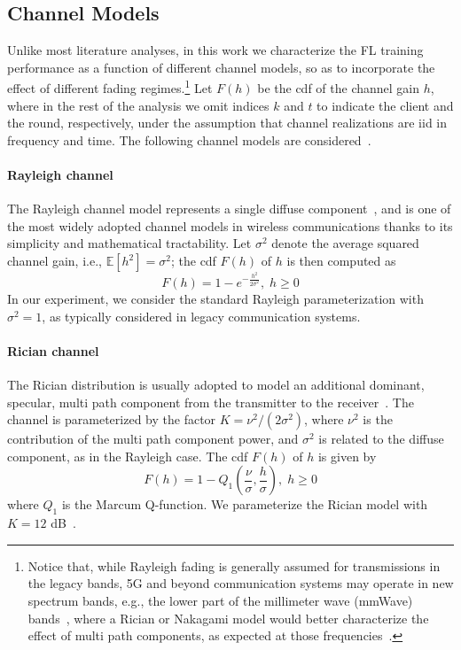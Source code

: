 \documentclass[10pt, conference, letterpaper]{IEEEtran}
\begin{document}
	\subsection{Channel Models}
	\label{sub:channel}
	Unlike most literature analyses, in this work we  characterize the FL training performance as a function of different channel models, so as to incorporate the effect of different fading regimes.\footnote{Notice that, while Rayleigh fading is generally assumed for transmissions in the legacy bands, 5G and beyond communication systems may operate in new spectrum bands, e.g., the lower part of the millimeter wave (mmWave) bands~\cite{rappaport2013millimeter}, where a Rician or Nakagami model would better characterize the effect of multi path components, as expected at those frequencies~\cite{lecci2020simplified}.}
	Let $F(h)$ be the \gls{cdf} of the channel gain $h$, where in the rest of the analysis we omit indices $k$ and $t$ to indicate the client and the round, respectively, under the assumption that channel realizations are \gls{iid} in frequency and time. The following channel models are considered~\cite{Angjelichinoski2019}.
	
	\paragraph{Rayleigh channel}
	The Rayleigh channel model represents a single diffuse component~\cite{Durgin2002}, and is one of the most widely adopted channel models in wireless communications thanks to its simplicity and mathematical tractability. Let $\sigma^2$ denote the average squared channel gain, i.e., $\mathbb{E}[h^2] = \sigma^2$; the \gls{cdf} $F(h)$ of $h$ is then computed as
	\begin{equation}
		F (h) = 1 - e^{-\frac{h^2}{2\sigma^2}}, \; h \geq 0
	\end{equation}   
	In our experiment, we consider the standard Rayleigh parameterization with $\sigma^2 = 1$, as typically considered in legacy communication systems.
	
	
	\paragraph{Rician channel} 
	The Rician distribution is usually adopted to model an additional dominant, specular, multi path component from the transmitter to the receiver~\cite{Durgin2002}. The channel is parameterized by the factor $K = \nu^2/(2\sigma^2)$, where $\nu^2$ is the contribution of the multi path component power, and $\sigma^2$ is related to the diffuse component, as in the Rayleigh case. The \gls{cdf} $F(h)$ of $h$ is given by
	\begin{equation}
		F(h) = 1 - Q_1\left(\frac{\nu}{\sigma}, \frac{h}{\sigma}\right), \; h \geq 0
	\end{equation}
	where $Q_1$ is the Marcum Q-function. We parameterize the Rician model with $K=12$ dB~\cite{Samimi2016}.
	
\end{document}
